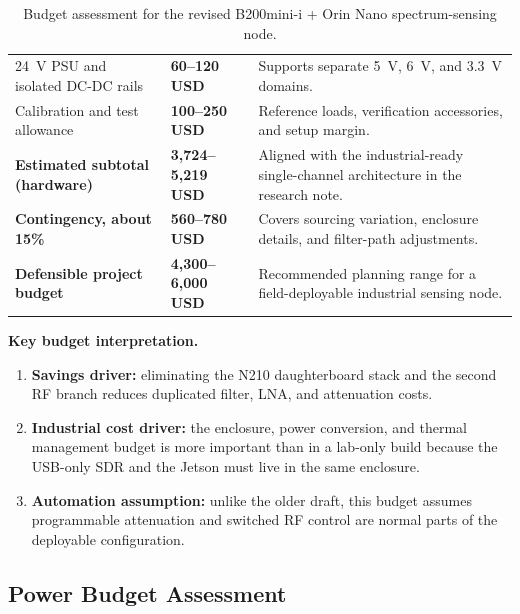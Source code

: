 \documentclass[11pt,a4paper]{article}
\newcommand{\blue}[1]{\textcolor{priceblue}{\textbf{#1}}}
\begin{document}
\begin{table}[htbp]
{\begin{tabular}{p{5.3cm}p{2.8cm}p{5.8cm}}
		24~V PSU and isolated DC-DC rails &
		\blue{60--120 USD} &
		Supports separate 5~V, 6~V, and 3.3~V domains. \\

		Calibration and test allowance &
		\blue{100--250 USD} &
		Reference loads, verification accessories, and setup margin. \\

		\midrule

		\textbf{Estimated subtotal (hardware)} &
		\blue{3,724--5,219 USD} &
		Aligned with the industrial-ready single-channel architecture in the research note. \\

		\textbf{Contingency, about 15\%} &
		\blue{560--780 USD} &
		Covers sourcing variation, enclosure details, and filter-path adjustments. \\

		\midrule

		{\large\textbf{Defensible project budget}} &
		{\large\blue{4,300--6,000 USD}} &
		Recommended planning range for a field-deployable industrial sensing node. \\

		\bottomrule
	\end{tabular}
	}
	\caption{Budget assessment for the revised B200mini-i + Orin Nano spectrum-sensing node.}
	\label{tab:total-bom-assessment}
\end{table}

\noindent
\textbf{Key budget interpretation.}
\begin{enumerate}
	\item \textbf{Savings driver:} eliminating the N210 daughterboard stack and the
	second RF branch reduces duplicated filter, LNA, and attenuation costs.
	\item \textbf{Industrial cost driver:} the enclosure, power conversion, and
	thermal management budget is more important than in a lab-only build because the
	USB-only SDR and the Jetson must live in the same enclosure.
	\item \textbf{Automation assumption:} unlike the older draft, this budget assumes
	programmable attenuation and switched RF control are normal parts of the
	deployable configuration.
\end{enumerate}

\subsection*{Power Budget Assessment}
\end{document}
